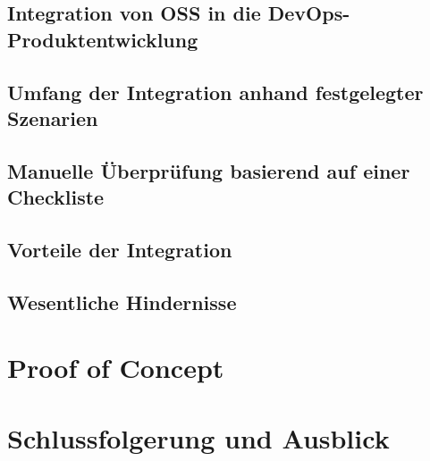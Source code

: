 \documentclass[12pt,titlepage]{article}
\begin{document}
\subsection{Integration von OSS in die DevOps-Produktentwicklung}


\subsection{Umfang der Integration anhand festgelegter Szenarien}


\subsection{Manuelle Überprüfung basierend auf einer Checkliste}


\subsection{Vorteile der Integration}


\subsection{Wesentliche Hindernisse}



\section{Proof of Concept}




\section{Schlussfolgerung und Ausblick}






\newpage


\end{document}

